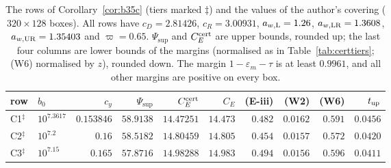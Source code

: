 \documentclass[11pt]{amsart}
\theoremstyle{definition}
\theoremstyle{remark}
\numberwithin{equation}{section}
\begin{document}
\begin{table}[ht]
\centering
\footnotesize
\begin{tabular}{llrrrrrrrr}
\toprule
row & $b_0$ & $c_y$ & $\Psi_{\sup}$ & $C_E^{\rm cert}$ & $C_E$ & (E-iii) & (W2) & (W6) & $t_{\rm up}$\\
\midrule
C1$^\ddagger$ & $10^{7.3617}$ & $0.153846$ & $58.9138$ & $14.47251$ & $14.473$ & $0.482$ & $0.0162$ & $0.591$ & $0.0456$\\
C2$^\ddagger$ & $10^{7.2}$ & $0.16$ & $58.5182$ & $14.80459$ & $14.805$ & $0.454$ & $0.0157$ & $0.572$ & $0.0420$\\
C3$^\ddagger$ & $10^{7.15}$ & $0.165$ & $57.8716$ & $14.98288$ & $14.983$ & $0.494$ & $0.0156$ & $0.596$ & $0.0411$\\
\bottomrule
\end{tabular}
\medskip
\caption{The rows of Corollary~\ref{cor:b35c} (tiers marked $\ddagger$) and the values of the author's covering
($320\times128$ boxes). All rows have $c_D=2.81426$, $c_R=3.00931$, $a_{w,\rm L}=1.26$, $a_{w,\rm LR}=1.3608$, $a_{w,\rm UR}=1.35403$ and $\varpi=0.65$. $\Psi_{\sup}$ and $C_E^{\rm cert}$ are upper bounds, rounded up; the
last four columns are lower bounds of the margins (normalised as in Table~\ref{tab:certtiers}; (W6) normalised by $z$),
rounded down. The margin $1-\varepsilon_m-\tau$ is at least $0.9961$, and all other margins are positive on every
box.}\label{tab:certC}
\end{table}
\end{document}
